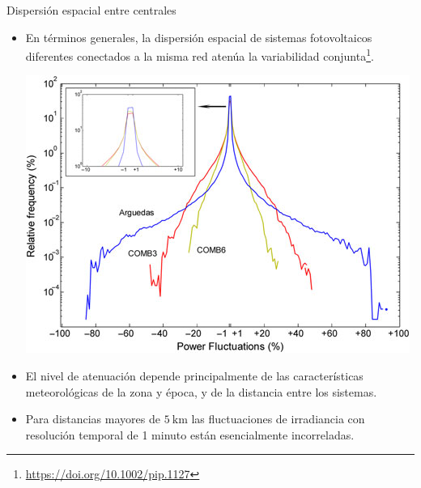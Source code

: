 \documentclass[aspectratio=169, usenames,svgnames,dvipsnames]{beamer}
\begin{document}
\begin{frame}[label={sec:orgf2b6c02}]{Dispersión espacial entre centrales}
\begin{itemize}
\item En términos generales, la \alert{dispersión espacial de sistemas
fotovoltaicos diferentes} conectados a la misma red \alert{atenúa} la
variabilidad conjunta\footnote{\url{https://doi.org/10.1002/pip.1127}}.

\begin{center}
\includegraphics[height=0.5\textheight]{../figs/Variabilidad_DispersionGeografica_Plantas.png}
\end{center}

\item El \alert{nivel de atenuación depende} principalmente de las
\alert{características meteorológicas} de la zona y época, y de la
\alert{distancia} entre los sistemas.

\item Para \alert{distancias mayores de \(\SI{5}{\kilo\meter}\)} las fluctuaciones
de irradiancia con resolución temporal de 1 minuto están
esencialmente \alert{incorreladas}.
\end{itemize}
\end{frame}
\end{document}
